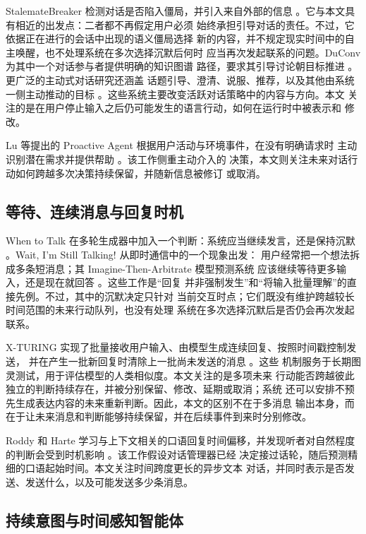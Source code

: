 \documentclass[manuscript,nonacm]{acmart}
\begin{document}
StalemateBreaker 检测对话是否陷入僵局，并引入来自外部的信息
\cite{li2016stalemate}。它与本文具有相近的出发点：二者都不再假定用户必须
始终承担引导对话的责任。不过，它依据正在进行的会话中出现的语义僵局选择
新的内容，并不规定现实时间中的自主唤醒，也不处理系统在多次选择沉默后何时
应当再次发起联系的问题。DuConv 为其中一个对话参与者提供明确的知识图谱
路径，要求其引导讨论朝目标推进 \cite{wu2019duconv}。更广泛的主动式对话研究还涵盖
话题引导、澄清、说服、推荐，以及其他由系统一侧主动推动的目标
\cite{deng2023survey}。这些系统主要改变活跃对话策略中的内容与方向。本文
关注的是在用户停止输入之后仍可能发生的语言行动，如何在运行时中被表示和
修改。

Lu 等提出的 Proactive Agent 根据用户活动与环境事件，在没有明确请求时
主动识别潜在需求并提供帮助 \cite{lu2025proactive}。该工作侧重主动介入的
决策，本文则关注未来对话行动如何跨越多次决策持续保留，并随新信息被修订
或取消。

\subsection{等待、连续消息与回复时机}

When to Talk 在多轮生成器中加入一个判断：系统应当继续发言，还是保持沉默
\cite{lan2019when}。Wait, I'm Still Talking! 从即时通信中的一个现象出发：
用户经常把一个想法拆成多条短消息；其 Imagine-Then-Arbitrate 模型预测系统
应该继续等待更多输入，还是现在就回答 \cite{lin2020wait}。这些工作是“回复
并非强制发生”和“将输入批量理解”的直接先例。不过，其中的沉默决定只针对
当前交互时点；它们既没有维护跨越较长时间范围的未来行动队列，也没有处理
系统在多次选择沉默后是否仍会再次发起联系。

X-TURING 实现了批量接收用户输入、由模型生成连续回复、按照时间戳控制发送，
并在产生一批新回复时清除上一批尚未发送的消息 \cite{wu2025xturing}。这些
机制服务于长期图灵测试，用于评估模型的人类相似度。本文关注的是多项未来
行动能否跨越彼此独立的判断持续存在，并被分别保留、修改、延期或取消；系统
还可以安排不预先生成表达内容的未来重新判断。因此，本文的区别不在于多消息
输出本身，而在于让未来消息和判断能够持续保留，并在后续事件到来时分别修改。

Roddy 和 Harte 学习与上下文相关的口语回复时间偏移，并发现听者对自然程度
的判断会受到时机影响 \cite{roddy2020timings}。该工作假设对话管理器已经
决定接过话轮，随后预测精细的口语起始时间。本文关注时间跨度更长的异步文本
对话，并同时表示是否发送、发送什么，以及可能发送多少条消息。

\subsection{持续意图与时间感知智能体}
\end{document}
